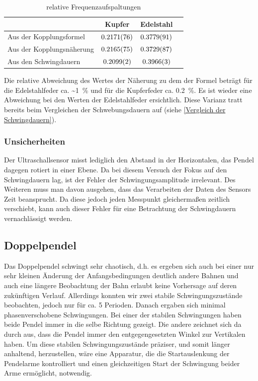 \documentclass[
	a4paper,
	12pt,
	pagesize,
	ngerman
]{scrartcl}
\begin{document}
	\begin{table}[H]
	\centering
	\begin{tabular}{ l | c | c | c |}
		& Kupfer & Edelstahl  \\ \hline
		Aus der Kopplungsformel   &$\SI{0,2171 \pm 0,0076}{}$&$\SI{0,3779 \pm 0,0091}{}$\\  \hline
		Aus der Kopplungsnäherung   &$\SI{0,2165 \pm 0,0075}{}$&$\SI{0,3729 \pm 0,0087}{}$\\  \hline
		Aus den Schwingdauern   &$\SI{0,2099 \pm 0,0002}{}$&$\SI{0,3966 \pm 0,0003}{}$\\  \hline
	\end{tabular}
	\caption{relative Frequenzaufspaltungen}
	\end{table}
	\noindent{}Die relative Abweichung des Wertes der Näherung zu dem der Formel beträgt für die Edelstahlfeder ca. \SI{~1}{\%} und für die Kupferfeder ca. \SI{0,2}{\%}.
	Es ist wieder eine Abweichung bei den Werten der Edelstahlfeder ersichtlich. Diese Varianz tratt bereits beim Vergleichen der Schwebungsdauern auf (siehe \cref{Vergleich der Schwingdauern}).


	
	\subsubsection*{Unsicherheiten}
	Der Ultraschallsensor misst lediglich den Abstand in der Horizontalen, das Pendel dagegen rotiert in einer Ebene. Da bei diesem Versuch der Fokus auf den Schwingdauern lag, ist der Fehler der Schwingungsamplitude irrelevant. Des Weiteren muss man davon ausgehen, dass das Verarbeiten der Daten des Sensors Zeit beansprucht. Da diese jedoch jeden Messpunkt gleichermaßen zeitlich verschiebt, kann auch dieser Fehler für eine Betrachtung der Schwingdauern vernachlässigt werden.
	
	


	\subsection{Doppelpendel}
	Das Doppelpendel schwingt sehr chaotisch, d.h. es ergeben sich auch bei einer nur sehr kleinen Änderung der Anfangsbedingungen deutlich andere Bahnen und auch eine längere Beobachtung der Bahn erlaubt keine Vorhersage auf deren zukünftigen Verlauf. Allerdings konnten wir zwei stabile Schwingungszustände beobachten, jedoch nur für ca. 5 Perioden. Danach ergaben sich minimal phasenverschobene Schwingungen. Bei einer der stabilen Schwingungen haben beide Pendel immer in die selbe Richtung gezeigt. Die andere zeichnet sich da durch aus, dass die Pendel immer den entgegengesetzten Winkel zur Vertikalen haben. Um diese stabilen Schwingungszustände präziser, und somit länger anhaltend, herzustellen, wäre eine Apparatur, die die Startauslenkung der Pendelarme kontrolliert und einen gleichzeitigen Start der Schwingung beider Arme ermöglicht, notwendig.%
\end{document}
